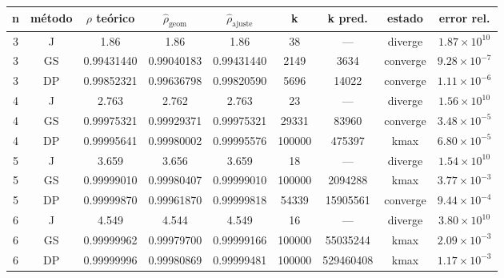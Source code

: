 {\scriptsize
\begin{tabular}{ccccccccc}
\toprule
\rowcolor{Azul1!50}
n & método & $\rho$ teórico & $\hat\rho_{\mathrm{geom}}$ & $\hat\rho_{\mathrm{ajuste}}$ & k & k pred. & estado & error rel. \\
\midrule
3 & J & 1.86 & 1.86 & 1.86 & 38 & --- & diverge & $1.87\times10^{10}$ \\
3 & GS & 0.99431440 & 0.99040183 & 0.99431440 & 2149 & 3634 & converge & $9.28\times10^{-7}$ \\
3 & DP & 0.99852321 & 0.99636798 & 0.99820590 & 5696 & 14022 & converge & $1.11\times10^{-6}$ \\
4 & J & 2.763 & 2.762 & 2.763 & 23 & --- & diverge & $1.56\times10^{10}$ \\
4 & GS & 0.99975321 & 0.99929371 & 0.99975321 & 29331 & 83960 & converge & $3.48\times10^{-5}$ \\
4 & DP & 0.99995641 & 0.99980002 & 0.99995576 & 100000 & 475397 & kmax & $6.80\times10^{-5}$ \\
5 & J & 3.659 & 3.656 & 3.659 & 18 & --- & diverge & $1.54\times10^{10}$ \\
5 & GS & 0.99999010 & 0.99980407 & 0.99999010 & 100000 & 2094288 & kmax & $3.77\times10^{-3}$ \\
5 & DP & 0.99999870 & 0.99961870 & 0.99999818 & 54339 & 15905561 & converge & $9.44\times10^{-4}$ \\
6 & J & 4.549 & 4.544 & 4.549 & 16 & --- & diverge & $3.80\times10^{10}$ \\
6 & GS & 0.99999962 & 0.99979700 & 0.99999166 & 100000 & 55035244 & kmax & $2.09\times10^{-3}$ \\
6 & DP & 0.99999996 & 0.99980869 & 0.99999481 & 100000 & 529460408 & kmax & $1.17\times10^{-3}$ \\
\bottomrule
\end{tabular}}
